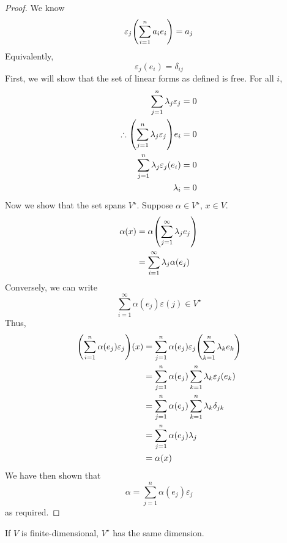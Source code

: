 \begin{proof}
	We know
	\[
		\varepsilon_j \qty( \sum_{i=1}^n a_i e_i ) = a_j
	\]
	Equivalently,
	\[
		\varepsilon_j (e_i) = \delta_{ij}
	\]
	First, we will show that the set of linear forms as defined is free.
	For all \( i \),
	\begin{align*}
		\sum_{j=1}^n \lambda_j \varepsilon_j                        & = 0 \\
		\therefore \qty( \sum_{j=1}^n \lambda_j \varepsilon_j ) e_i & = 0 \\
		\sum_{j=1}^n \lambda_j \varepsilon_j(e_i)                   & = 0 \\
		\lambda_i                                                   & = 0
	\end{align*}
	Now we show that the set spans \( V^\star \).
	Suppose \( \alpha \in V^\star \), \( x \in V \).
	\begin{align*}
		\alpha(x) & = \alpha\qty(\sum_{j=1}^\infty \lambda_j e_j) \\
		          & = \sum_{i=1}^\infty \lambda_j \alpha(e_j)
	\end{align*}
	Conversely, we can write
	\[
		\sum_{i=1}^\infty \alpha(e_j) \varepsilon(j) \in V^\star
	\]
	Thus,
	\begin{align*}
		\qty( \sum_{i=1}^n \alpha(e_j) \varepsilon_j) (x) & = \sum_{j=1}^n \alpha(e_j) \varepsilon_j\qty(\sum_{k=1}^n \lambda_k e_k) \\
		                                                  & = \sum_{j=1}^n \alpha(e_j) \sum_{k=1}^n \lambda_k \varepsilon_j(e_k)     \\
		                                                  & = \sum_{j=1}^n \alpha(e_j) \sum_{k=1}^n \lambda_k \delta_{jk}            \\
		                                                  & = \sum_{j=1}^n \alpha(e_j) \lambda_j                                     \\
		                                                  & = \alpha(x)
	\end{align*}
	We have then shown that
	\[
		\alpha = \sum_{j=1}^n \alpha(e_j) \varepsilon_j
	\]
	as required.
\end{proof}
\begin{corollary}
	If \( V \) is finite-dimensional, \( V^\star \) has the same dimension.
\end{corollary}
